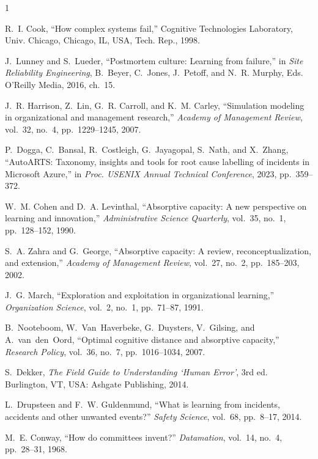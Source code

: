 \documentclass[conference,10pt]{IEEEtran}
\begin{document}

\begin{thebibliography}{1}

R.~I. Cook, ``How complex systems fail,'' Cognitive Technologies Laboratory, Univ. Chicago, Chicago, IL, USA, Tech. Rep., 1998.

J.~Lunney and S.~Lueder, ``Postmortem culture: Learning from failure,'' in \textit{Site Reliability Engineering}, B.~Beyer, C.~Jones, J.~Petoff, and N.~R. Murphy, Eds. O'Reilly Media, 2016, ch.~15.

J.~R. Harrison, Z.~Lin, G.~R. Carroll, and K.~M. Carley, ``Simulation modeling in organizational and management research,'' \textit{Academy of Management Review}, vol.~32, no.~4, pp.~1229--1245, 2007.

P.~Dogga, C.~Bansal, R.~Costleigh, G.~Jayagopal, S.~Nath, and X.~Zhang, ``AutoARTS: Taxonomy, insights and tools for root cause labelling of incidents in Microsoft Azure,'' in \textit{Proc. USENIX Annual Technical Conference}, 2023, pp.~359--372.

W.~M. Cohen and D.~A. Levinthal, ``Absorptive capacity: A new perspective on learning and innovation,'' \textit{Administrative Science Quarterly}, vol.~35, no.~1, pp.~128--152, 1990.

S.~A. Zahra and G.~George, ``Absorptive capacity: A review, reconceptualization, and extension,'' \textit{Academy of Management Review}, vol.~27, no.~2, pp.~185--203, 2002.

J.~G. March, ``Exploration and exploitation in organizational learning,'' \textit{Organization Science}, vol.~2, no.~1, pp.~71--87, 1991.

B.~Nooteboom, W.~Van~Haverbeke, G.~Duysters, V.~Gilsing, and A.~van~den~Oord, ``Optimal cognitive distance and absorptive capacity,'' \textit{Research Policy}, vol.~36, no.~7, pp.~1016--1034, 2007.

S.~Dekker, \textit{The Field Guide to Understanding `Human Error'}, 3rd ed. Burlington, VT, USA: Ashgate Publishing, 2014.

L.~Drupsteen and F.~W. Guldenmund, ``What is learning from incidents, accidents and other unwanted events?'' \textit{Safety Science}, vol.~68, pp.~8--17, 2014.

M.~E. Conway, ``How do committees invent?'' \textit{Datamation}, vol.~14, no.~4, pp.~28--31, 1968.


\end{thebibliography}
\end{document}
